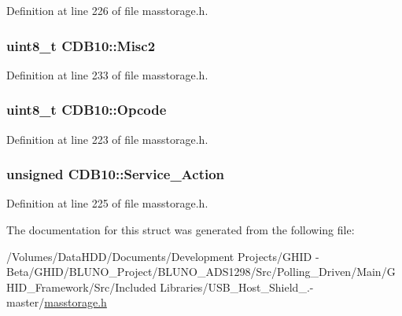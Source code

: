 \-Definition at line 226 of file masstorage.\-h.

\hypertarget{struct_c_d_b10_a26b2c33b7867c33d19e77c6d873d7924}{
\subsubsection[{\-Misc2}]{\setlength{\rightskip}{0pt plus 5cm}uint8\-\_\-t {\bf \-C\-D\-B10\-::\-Misc2}}}\label{struct_c_d_b10_a26b2c33b7867c33d19e77c6d873d7924}


\-Definition at line 233 of file masstorage.\-h.

\hypertarget{struct_c_d_b10_af18bbff0fec1a1d31c741c542f2e92d6}{
\subsubsection[{\-Opcode}]{\setlength{\rightskip}{0pt plus 5cm}uint8\-\_\-t {\bf \-C\-D\-B10\-::\-Opcode}}}\label{struct_c_d_b10_af18bbff0fec1a1d31c741c542f2e92d6}


\-Definition at line 223 of file masstorage.\-h.

\hypertarget{struct_c_d_b10_af1cd479d32aae0c581b735eb5aa081bc}{
\subsubsection[{\-Service\-\_\-\-Action}]{\setlength{\rightskip}{0pt plus 5cm}unsigned {\bf \-C\-D\-B10\-::\-Service\-\_\-\-Action}}}\label{struct_c_d_b10_af1cd479d32aae0c581b735eb5aa081bc}


\-Definition at line 225 of file masstorage.\-h.



\-The documentation for this struct was generated from the following file\-:\begin{DoxyCompactItemize}
\item 
/\-Volumes/\-Data\-H\-D\-D/\-Documents/\-Development Projects/\-G\-H\-I\-D -\/ Beta/\-G\-H\-I\-D/\-B\-L\-U\-N\-O\-\_\-\-Project/\-B\-L\-U\-N\-O\-\_\-\-A\-D\-S1298/\-Src/\-Polling\-\_\-\-Driven/\-Main/\-G\-H\-I\-D\-\_\-\-Framework/\-Src/\-Included Libraries/\-U\-S\-B\-\_\-\-Host\-\_\-\-Shield\-\_.-\/master/\hyperlink{masstorage_8h}{masstorage.\-h}\end{DoxyCompactItemize}
